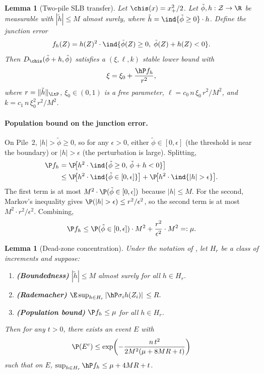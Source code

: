 \documentclass{article}
\newtheorem{lemma}[theorem]{Lemma}
\begin{document}
\begin{lemma}[Two-pile SLB transfer]
\label{lem:two-pile}
Let $\chis(x) = x_+^2/2$.
Let $\tilde\phi, h : \mathcal{Z} \to \R$ be measurable
with $|\tilde h| \le M$ almost surely,
where $\tilde h = \ind{\tilde\phi \ge 0} \cdot h$.
Define the junction error
\begin{equation}\label{eq:junction-error}
f_h(Z) = h(Z)^2 \cdot \ind{\tilde\phi(Z) \ge 0,\;\tilde\phi(Z) + h(Z) < 0}.
\end{equation}
Then $D_{\chis}(\tilde\phi+h,\tilde\phi)$
satisfies a $(\xi, \ell, k)$ stable lower bound with
\[
\xi = \xi_0 + \frac{\hP f_h}{r^2},
\]
where $r = \|\tilde h\|_{\LtP}$,
$\xi_0 \in (0,1)$ is a free parameter,
$\ell = c_0\, n\, \xi_0\, r^2/M^2$,
and $k = c_1\, n\, \xi_0^2\, r^2/M^2$.
\end{lemma}

\paragraph{Population bound on the junction error.}
On Pile~2, $|h| > \tilde\phi \ge 0$,
so for any $\epsilon > 0$,
either $\tilde\phi \in [0,\epsilon]$
(the threshold is near the boundary)
or $|h| > \epsilon$
(the perturbation is large).
Splitting,
\begin{align*}
\P f_h
  &= \P\!\qty[h^2 \cdot \ind{\tilde\phi \ge 0,\, \tilde\phi + h < 0}] \\
  &\le \P\!\qty[h^2 \cdot \ind{\tilde\phi \in [0,\epsilon]}]
    + \P\!\qty[h^2 \cdot \ind{|h| > \epsilon}].
\end{align*}
The first term is at most
$M^2 \cdot \P(\tilde\phi \in [0,\epsilon])$
because $|h| \le M$.
For the second, Markov's inequality gives
$\P(|h| > \epsilon) \le r^2/\epsilon^2$,
so the second term is at most
$M^2 \cdot r^2/\epsilon^2$.
Combining,
\begin{equation}\label{eq:junction-population}
\P f_h \le \P(\tilde\phi \in [0,\epsilon]) \cdot M^2
  + \frac{r^2}{\epsilon^2} \cdot M^2 =: \mu.
\end{equation}

\begin{lemma}[Dead-zone concentration]
\label{lem:dead-zone-concentration}
Under the notation of ,
let $H_r$ be a class of increments and suppose:
\begin{enumerate}
\item[\textup{(i)}] \textbf{(Boundedness)}
  $|\tilde h| \le M$ almost surely for all $h \in H_r$.
\item[\textup{(ii)}] \textbf{(Rademacher)}
  $\E\sup_{h \in H_r} \abs*{\hP \sigma_i h(Z_i)}
    \le R.$
\item[\textup{(iii)}] \textbf{(Population bound)}
  $\P f_h \le \mu$ for all $h \in H_r$.
\end{enumerate}
Then for any $t > 0$,
there exists an event $E$ with
\[
\P(E^c)
  \le \exp\!\qty(-\frac{n\, t^2}
    {2M^2(\mu + 8MR + t)})
\]
such that on $E$,
$\sup_{h \in H_r} \hP f_h \le \mu + 4MR + t$.
\end{lemma}
\end{document}
